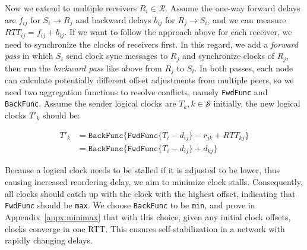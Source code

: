 Now we extend to multiple receivers $R_i \in \mathcal{R}$.
Assume the one-way forward delays are $f_{ij}$ for $S_i \rightarrow R_j$ and backward delays $b_{ij}$ for $R_j \rightarrow S_i$, and we can measure $RTT_{ij} = f_{ij} + b_{ij}$.
If we want to follow the approach above for each receiver, we need to synchronize the clocks of receivers first.
In this regard, we add a \textit{forward pass} in which $S_i$ send clock sync messages to $R_j$ and synchronize clocks of $R_j$, then run the \textit{backward pass} like above from $R_j$ to $S_i$.
In both passes, each node can calculate potentially different offset adjustments from multiple peers, so we need two aggregation functions to resolve conflicts, namely \texttt{FwdFunc} and \texttt{BackFunc}.
Assume the sender logical clocks are $T_k, k \in \mathcal{S}$ initially, the new logical clocks $T'_k$ should be:

\vspace{-1em}
\begin{equation*}
\begin{aligned}
T'_k & = \texttt{BackFunc} \{ \texttt{FwdFunc} \{ T_i - d_{ij} \} - r_{jk} + RTT_{kj} \} \\
     & = \texttt{BackFunc} \{ \texttt{FwdFunc} \{ T_i - d_{ij} \} + d_{kj} \}
\end{aligned}
\end{equation*}

Because a logical clock needs to be stalled if it is adjusted to be lower, thus causing increased reordering delay, we aim to minimize clock stalls.
Consequently, all clocks should catch up with the clock with the highest offset, indicating that \texttt{FwdFunc} should be \texttt{max}.
We choose \texttt{BackFunc} to be \texttt{min}, and prove in Appendix~\ref{appx:minimax} that with this choice, given any initial clock offsets, clocks converge in one RTT.
This ensures self-stabilization in a network with rapidly changing delays.

